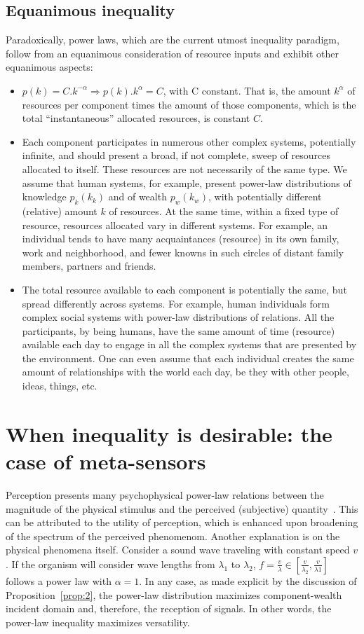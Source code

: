 \documentclass[a4paper, 11pt]{article} %
\begin{document}
\subsection{Equanimous inequality}
Paradoxically, power laws, which are the 
current utmost inequality paradigm,
follow from an equanimous consideration
of resource inputs
and exhibit other equanimous aspects:
\begin{itemize}
	\item $p(k)=C.k^{-\alpha} \Rightarrow p(k).k^{\alpha}=C$, with C constant. That is, the amount $k^\alpha$ of resources per component times the amount of those components, which is the total ``instantaneous'' allocated resources, is constant $C$.
	\item Each component participates in numerous other complex systems, potentially infinite, and should present a broad, if not complete, sweep of resources allocated to itself.
		These resources are not necessarily of the same type. We assume that human systems, for example, present power-law distributions of knowledge $p_k(k_k)$ and of wealth $p_w(k_w)$, with potentially different (relative) amount $k$ of resources. At the same time, within a fixed type of resource, resources allocated vary in  different systems. For example, an individual tends to have many acquaintances (resource) in its own family, work and neighborhood, and fewer knowns in such circles of distant family members, partners and friends.
	\item The total resource available to each component is potentially the same, but spread differently across systems. For example, human individuals form complex social systems with power-law distributions of relations. All the participants, by being humans, have the same amount of time (resource) available each day to engage in all the complex systems that are presented by the environment. One can even assume that each individual creates the same amount of relationships with the world each day, be they with other people, ideas, things, etc. 
\end{itemize}


\section{When inequality is desirable: the case of meta-sensors}\label{sec:meta}
Perception presents many psychophysical power-law 
relations between the
magnitude of the physical stimulus and the perceived 
(subjective) quantity~\cite{pbook}.
This can be attributed to the utility of perception,
which is enhanced upon broadening of the spectrum of the perceived phenomenom.
Another explanation is on the physical phenomena itself.
Consider a sound wave traveling with constant speed $v$.
If the organism will consider wave lengths from $\lambda_1$
to $\lambda_2$, $f=\frac{v}{\lambda} \in [\frac{v}{\lambda_2},\frac{v}{\lambda1}]$ follows
a power law with $\alpha=1$.
In any case, as made explicit by the discussion of
Proposition~\ref{prop:2}, the power-law distribution
maximizes component-wealth incident domain and,
therefore, the reception of signals.
In other words, the power-law inequality
maximizes versatility.
\end{document}
